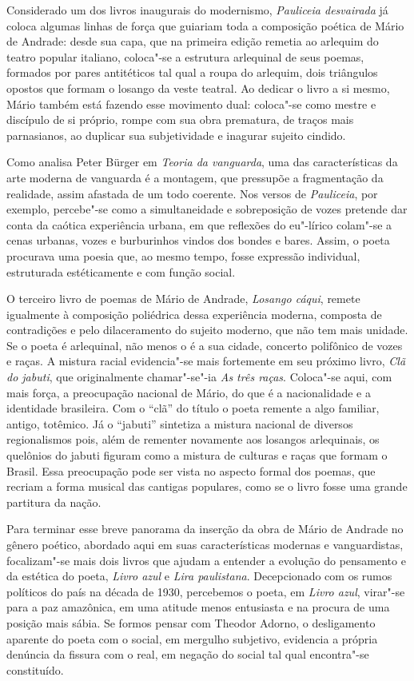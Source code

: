 Considerado um dos livros inaugurais do modernismo, \emph{Pauliceia desvairada}
já coloca algumas linhas de força que guiariam toda a composição poética de Mário de Andrade: desde sua capa, que na primeira edição remetia ao arlequim do teatro popular italiano, coloca"-se a estrutura arlequinal de seus poemas, formados por pares antitéticos tal qual a roupa do arlequim, dois triângulos opostos que formam o losango da veste teatral. Ao dedicar o livro a si mesmo, Mário também está fazendo esse movimento dual: coloca"-se como mestre e discípulo de si próprio, rompe com sua obra prematura, de traços mais parnasianos, ao duplicar sua subjetividade e inagurar sujeito cindido.

Como analisa Peter Bürger em \textit{Teoria da vanguarda}, uma das características da arte moderna de vanguarda é a montagem, que pressupõe a fragmentação da realidade, assim afastada de um todo coerente. Nos versos de \textit{Pauliceia}, por exemplo, percebe"-se como a simultaneidade e sobreposição de vozes pretende dar conta da caótica experiência urbana, em que reflexões do eu"-lírico colam"-se a cenas urbanas, vozes e burburinhos vindos dos bondes e bares.
Assim, o poeta procurava uma poesia que, ao mesmo tempo, fosse expressão individual, estruturada estéticamente e com função social.

O terceiro livro de poemas de Mário de Andrade, \textit{Losango cáqui}, remete igualmente à composição poliédrica dessa experiência moderna, composta de contradições e pelo dilaceramento do sujeito moderno, que não tem mais unidade.
Se o poeta é arlequinal, não menos o é a sua cidade, concerto polifônico de vozes e raças. A mistura racial evidencia"-se mais fortemente em seu próximo livro, \textit{Clã do jabuti}, que originalmente chamar"-se"-ia \textit{As três raças}.
Coloca"-se aqui, com mais força, a preocupação nacional de Mário, do que é a nacionalidade e a identidade brasileira. Com o ``clã'' do título o poeta remente a algo familiar, antigo, totêmico. Já o ``jabuti'' sintetiza a mistura nacional de diversos regionalismos pois, além de rementer novamente aos losangos arlequinais, os quelônios do jabuti figuram como a mistura de culturas e raças que formam o Brasil. Essa preocupação pode ser vista no aspecto formal dos poemas, que recriam a forma musical das cantigas populares, como se o livro fosse uma grande partitura da nação.

Para terminar esse breve panorama da inserção da obra de Mário de Andrade no gênero poético, abordado aqui em suas características modernas e vanguardistas, focalizam"-se mais dois livros que ajudam a entender a evolução do pensamento e da estética do poeta, \textit{Livro azul} e \textit{Lira paulistana}.
Decepcionado com os rumos políticos do país na década de 1930, percebemos o poeta, em \textit{Livro azul}, virar"-se para a paz amazônica, em uma atitude menos entusiasta e na procura de uma posição mais sábia. 
Se formos pensar com Theodor Adorno, o desligamento aparente do poeta com o social, em mergulho subjetivo, evidencia a própria denúncia da fissura com o real, em negação do social tal qual encontra"-se constituído.

